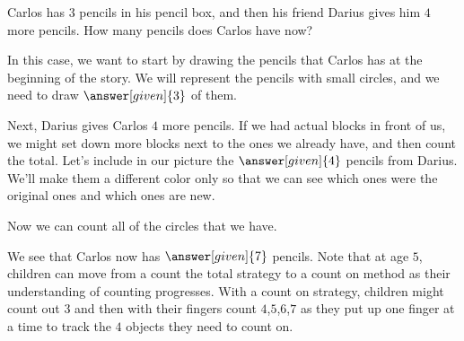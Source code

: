 \documentclass{ximera}
\begin{document}
\begin{question}
Carlos has $3$ pencils in his pencil box, and then his friend Darius gives him $4$ more pencils. How many pencils does Carlos have now?

\begin{explanation}
In this case, we want to start by drawing the pencils that Carlos has at the beginning of the story. We will represent the pencils with small circles, and we need to draw $\answer[given]{3}$ of them.

\begin{image}
\end{image}

Next, Darius gives Carlos $4$ more pencils. If we had actual blocks in front of us, we might set down more blocks next to the ones we already have, and then count the total. Let's include in our picture the $\answer[given]{4}$ pencils from Darius. We'll make them a different color only so that we can see which ones were the original ones and which ones are new.

\begin{image}
\end{image}

Now we can count all of the circles that we have.

\begin{image}
\end{image}
We see that Carlos now has $\answer[given]{7}$ pencils. Note that at age $5$, children can move from a count the total strategy to a count on method as their understanding of counting progresses. With a count on strategy, children might count out $3$ and then with their fingers count $4$,$5$,$6$,$7$ as they put up one finger at a time to track the $4$ objects they need to count on.

\end{explanation}
\end{question}
\end{document}
